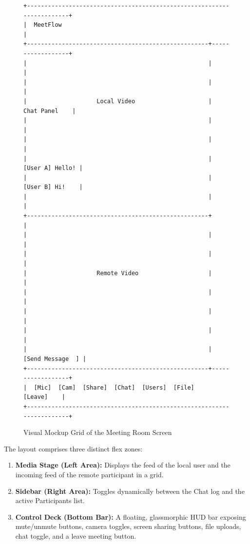 \documentclass[11pt,a4paper]{article}
\begin{document}
\begin{figure}[h!]
\centering
\begin{minipage}{0.9\textwidth}
\begin{verbatim}
+-----------------------------------------------------------------------+
|  MeetFlow                                                             |
+----------------------------------------------------+------------------+
|                                                    |                  |
|                                                    |                  |
|                    Local Video                     |    Chat Panel    |
|                                                    |                  |
|                                                    |                  |
|                                                    |  [User A] Hello! |
|                                                    |  [User B] Hi!    |
|                                                    |                  |
+----------------------------------------------------+                  |
|                                                    |                  |
|                                                    |                  |
|                    Remote Video                    |                  |
|                                                    |                  |
|                                                    |                  |
|                                                    |                  |
|                                                    | [Send Message  ] |
+----------------------------------------------------+------------------+
|  [Mic]  [Cam]  [Share]  [Chat]  [Users]  [File]            [Leave]    |
+-----------------------------------------------------------------------+
\end{verbatim}
\end{minipage}
\caption{Visual Mockup Grid of the Meeting Room Screen}
\label{fig:ui_grid}
\end{figure}

The layout comprises three distinct flex zones:
\begin{enumerate}
    \item \textbf{Media Stage (Left Area):} Displays the feed of the local user and the incoming feed of the remote participant in a grid.
    \item \textbf{Sidebar (Right Area):} Toggles dynamically between the Chat log and the active Participants list.
    \item \textbf{Control Deck (Bottom Bar):} A floating, glassmorphic HUD bar exposing mute/unmute buttons, camera toggles, screen sharing buttons, file uploads, chat toggle, and a leave meeting button.
\end{enumerate}
\end{document}
